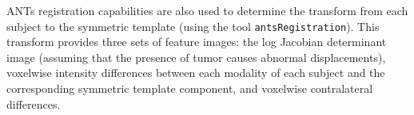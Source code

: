 \documentclass{llncs}
\begin{document}
ANTs registration capabilities \cite{avants2011a} are also used to determine the transform from 
each subject to the symmetric template (using the tool \verb#antsRegistration#).  
This transform provides three 
sets of feature images:  the log Jacobian determinant image (assuming that the 
presence of tumor causes abnormal displacements), voxelwise intensity differences between each modality of each subject and the corresponding symmetric template component, and voxelwise contralateral differences.  



\end{document}
